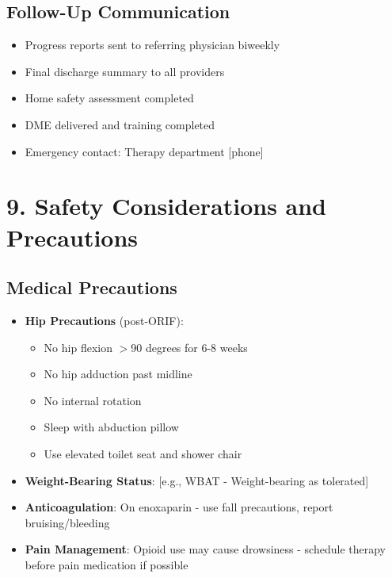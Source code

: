 \documentclass[11pt,letterpaper]{article}
\begin{document}
\subsection*{Follow-Up Communication}

\begin{itemize}[leftmargin=*]
    \item Progress reports sent to referring physician biweekly
    \item Final discharge summary to all providers
    \item Home safety assessment completed
    \item DME delivered and training completed
    \item Emergency contact: Therapy department [phone]
\end{itemize}

\section*{9. Safety Considerations and Precautions}

\subsection*{Medical Precautions}

\begin{itemize}[leftmargin=*]
    \item \textbf{Hip Precautions} (post-ORIF):
    \begin{itemize}
        \item No hip flexion $>$90 degrees for 6-8 weeks
        \item No hip adduction past midline
        \item No internal rotation
        \item Sleep with abduction pillow
        \item Use elevated toilet seat and shower chair
    \end{itemize}

    \item \textbf{Weight-Bearing Status}: [e.g., WBAT - Weight-bearing as tolerated]

    \item \textbf{Anticoagulation}: On enoxaparin - use fall precautions, report bruising/bleeding

    \item \textbf{Pain Management}: Opioid use may cause drowsiness - schedule therapy before pain medication if possible
\end{itemize}
\end{document}
